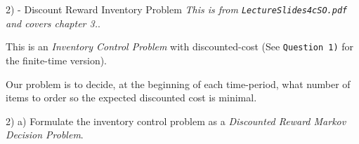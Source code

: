 \documentclass[11pt,a4paper]{article}
\begin{document}
\newpage
\begin{question}{2) - Discount Reward Inventory Problem}
  \textit{This is from \texttt{LectureSlides4cSO.pdf} and covers chapter 3.}.
  \par This is an \textit{Inventory Control Problem} with discounted-cost (See \texttt{Question 1)} for the finite-time version).
  \par Our problem is to decide, at the beginning of each time-period, what number of items to order so the expected discounted cost is minimal.
\end{question}

\begin{question}{2) a)}
  Formulate the inventory control problem as a \textit{Discounted Reward Markov Decision Problem}.
\end{question}
\end{document}
